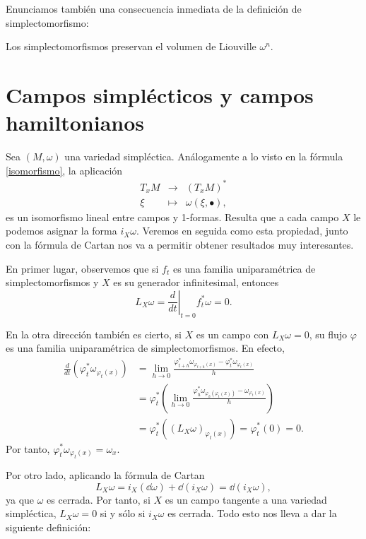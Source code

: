 Enunciamos también una consecuencia inmediata de la definición de simplectomorfismo:
\begin{prop}\label{volumen}
  Los simplectomorfismos preservan el volumen de Liouville $\omega^n$.
\end{prop}

\section{Campos simplécticos y campos hamiltonianos}\label{sec:hamilton}
Sea $(M,\omega)$ una variedad simpléctica. Análogamente a lo visto en la fórmula \eqref{isomorfismo}, la aplicación 
  \begin{equation*}
    \begin{array}{rcl}
      T_xM & \longrightarrow & (T_xM)^* \\
      \xi & \longmapsto & \omega(\xi,\bullet),
      \end{array} 
  \end{equation*}
es un isomorfismo lineal entre campos y 1-formas. Resulta que a cada campo $X$ le podemos asignar la forma $i_X \omega$. Veremos en seguida como esta propiedad, junto con la fórmula de Cartan nos va a permitir obtener resultados muy interesantes.

En primer lugar, observemos que si $f_t$ es una familia uniparamétrica de simplectomorfismos y $X$ es su generador infinitesimal, entonces
\begin{equation*}
  L_{X}\omega=\left.\frac{d}{dt}\right|_{t=0}f_t^*\omega=0.	
\end{equation*}

  En la otra dirección también es cierto, si $X$ es un campo con $L_X\omega=0$, su flujo $\varphi$ es una familia uniparamétrica de simplectomorfismos. 
  En efecto,
  \begin{align*}
    \frac{d}{dt}(\varphi^*_t\omega_{\varphi_t(x)})&=\lim_{h\rightarrow 0}\frac{\varphi^*_{t+h}\omega_{\varphi_{t+h}(x)}-\varphi^*_t\omega_{\varphi_t(x)}}{h}\\ &=\varphi^*_t\left( \lim_{h\rightarrow 0}\frac{\varphi^*_h\omega_{\varphi_h(\varphi_t(x))}-\omega_{\varphi_t(x)}}{h}\right)\\ &=\varphi_t^*((L_X\omega)_{\varphi_t(x)})=\varphi^*_t(0)=0. 
  \end{align*}
  Por tanto, $\varphi^*_t\omega_{\varphi_t(x)}=\omega_x$.

Por otro lado, aplicando la fórmula de Cartan
\begin{equation*}
  L_X\omega=i_X(\dd\omega)+\dd(i_X\omega)=\dd(i_X\omega),
\end{equation*}
ya que $\omega$ es cerrada. Por tanto, si $X$ es un campo tangente a una variedad simpléctica, $L_X\omega=0$ si y sólo si $i_X\omega$ es cerrada. Todo esto nos lleva a dar la siguiente definición:

